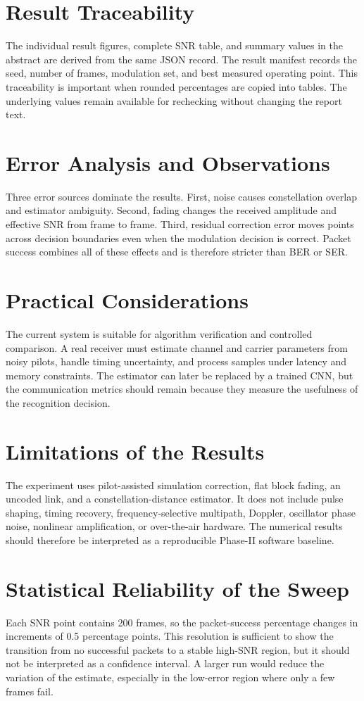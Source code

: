 \documentclass[12pt,twoside,openright]{report}
\begin{document}
\section{Result Traceability}
The individual result figures, complete SNR table, and summary values in the
abstract are derived from the same JSON record. The result manifest records
the seed, number of frames, modulation set, and best measured operating
point. This traceability is important when rounded percentages are copied
into tables. The underlying values remain available for rechecking without
changing the report text.


\section{Error Analysis and Observations}
Three error sources dominate the results. First, noise causes constellation
overlap and estimator ambiguity. Second, fading changes the received
amplitude and effective SNR from frame to frame. Third, residual correction
error moves points across decision boundaries even when the modulation
decision is correct. Packet success combines all of these effects and is
therefore stricter than BER or SER.

\section{Practical Considerations}
The current system is suitable for algorithm verification and controlled
comparison. A real receiver must estimate channel and carrier parameters
from noisy pilots, handle timing uncertainty, and process samples under
latency and memory constraints. The estimator can later be replaced by a
trained CNN, but the communication metrics should remain because they
measure the usefulness of the recognition decision.

\section{Limitations of the Results}
The experiment uses pilot-assisted simulation correction, flat block fading,
an uncoded link, and a constellation-distance estimator. It does not include
pulse shaping, timing recovery, frequency-selective multipath, Doppler,
oscillator phase noise, nonlinear amplification, or over-the-air hardware.
The numerical results should therefore be interpreted as a reproducible
Phase-II software baseline.

\section{Statistical Reliability of the Sweep}
Each SNR point contains 200 frames, so the packet-success percentage changes
in increments of 0.5 percentage points. This resolution is sufficient to
show the transition from no successful packets to a stable high-SNR region,
but it should not be interpreted as a confidence interval. A larger run
would reduce the variation of the estimate, especially in the low-error
region where only a few frames fail.
\end{document}
